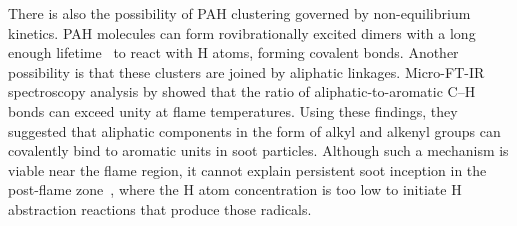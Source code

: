 
There is also the possibility of PAH clustering governed by non-equilibrium kinetics. PAH molecules can form rovibrationally excited dimers with a long enough lifetime~\cite{wong2009molecular} to react with H atoms, forming covalent bonds. Another possibility is that these clusters are joined by aliphatic linkages. Micro-FT-IR spectroscopy analysis by \citet{cain2011evidence} showed that the ratio of aliphatic-to-aromatic C–H bonds can exceed unity at flame temperatures. Using these findings, they suggested that aliphatic components in the form of alkyl and alkenyl groups can covalently bind to aromatic units in soot particles. Although such a mechanism is viable near the flame region, it cannot explain persistent soot inception in the post-flame zone~\citep{zhao2005particle}, where the H atom concentration is too low to initiate H abstraction reactions that produce those radicals.



